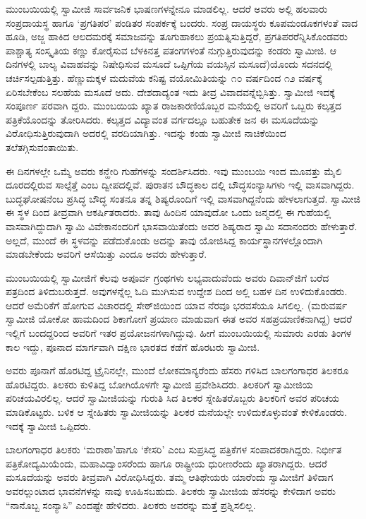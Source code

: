 ಮುಂಬಯಿಯಲ್ಲಿ ಸ್ವಾಮೀಜಿ ಸಾರ್ವಜನಿಕ ಭಾಷಣಗಳನ್ನೇನೂ ಮಾಡಲಿಲ್ಲ. ಆದರೆ ಅವರು ಅಲ್ಲಿ ಹಲವಾರು ಸಂಪ್ರದಾಯಸ್ಥ ಹಾಗೂ ‘ಪ್ರಗತಿಪರ’ ಪಂಡಿತರ ಸಂಪರ್ಕಕ್ಕೆ ಬಂದರು. ಸಂಪ್ರ ದಾಯಸ್ಥರು ಕೂಪಮಂಡೂಕಗಳಂತೆ ವಾದ ಹೂಡಿ, ಅಜ್ಜ ಹಾಕಿದ ಆಲದಮರಕ್ಕೆ ಸಮಾಜವನ್ನು ತೂಗುಹಾಕಲು ಪ್ರಯತ್ನಿಸುತ್ತಿದ್ದರೆ, ಪ್ರಗತಿಪರರೆನ್ನಿಸಿಕೊಂಡವರು ಪಾಶ್ಚಾತ್ಯ ಸಂಸ್ಕೃತಿಯ ಕಣ್ಣು ಕೋರೈಸುವ ಬೆಳಕಿನತ್ತ ಪತಂಗಗಳಂತೆ ನುಗ್ಗುತ್ತಿರುವುದನ್ನು ಕಂಡರು ಸ್ವಾಮೀಜಿ. ಆ ದಿನಗಳಲ್ಲಿ ಬಾಲ್ಯ ವಿವಾಹವನ್ನು ನಿಷೇಧಿಸುವ ಮಸೂದೆ ಒಪ್ಪಿಗೆಯ ವಯಸ್ಸಿನ ಮಸೂದೆ)ಯೊಂದು ಸದನದಲ್ಲಿ ಚರ್ಚಿಸಲ್ಪಡುತ್ತಿತ್ತು. ಹೆಣ್ಣುಮಕ್ಕಳ ಮದುವೆಯ ಕನಿಷ್ಟ ವಯೋಮಿತಿಯನ್ನು ೧೦ ವರ್ಷದಿಂದ ೧೨ ವರ್ಷಕ್ಕೆ ಏರಿಸಬೇಕೆಂಬ ಸಲಹೆಯ ಮಸೂದೆ ಅದು. ದೇಶದಾದ್ಯಂತ ಇದು ತೀವ್ರ ವಿವಾದವನ್ನೆಬ್ಬಿಸಿತ್ತು. ಸ್ವಾಮೀಜಿ ಇದಕ್ಕೆ ಸಂಪೂರ್ಣ ಪರವಾಗಿ ದ್ದರು. ಮುಂಬಯಿಯ ಖ್ಯಾತ ರಾಜಕಾರಣಿಯೊಬ್ಬರ ಮನೆಯಲ್ಲಿ ಅವರಿಗೆ ಒಬ್ಬರು ಕಲ್ಕತ್ತದ ಪತ್ರಿಕೆಯೊಂದನ್ನು ತೋರಿಸಿದರು. ಕಲ್ಕತ್ತದ ವಿದ್ಯಾವಂತ ವರ್ಗದಲ್ಲೂ ಬಹುತೇಕ ಜನ ಈ ಮಸೂದೆಯನ್ನು ವಿರೋಧಿಸುತ್ತಿರುವುದಾಗಿ ಅದರಲ್ಲಿ ವರದಿಯಾಗಿತ್ತು. ಇದನ್ನು ಕಂಡು ಸ್ವಾಮೀಜಿ ನಾಚಿಕೆಯಿಂದ ತಲೆತಗ್ಗಿಸುವಂತಾಯಿತು.

ಈ ದಿನಗಳಲ್ಲೇ ಒಮ್ಮೆ ಅವರು ಕನ್ಹೇರಿ ಗುಹೆಗಳನ್ನು ಸಂದರ್ಶಿಸಿದರು. ಇವು ಮುಂಬಯಿ ಇಂದ ಮೂವತ್ತು ಮೈಲಿ ದೂರದಲ್ಲಿರುವ ಸಾಲ್ಸೆತ್ತೆ ಎಂಬ ದ್ವೀಪದಲ್ಲಿವೆ. ಪುರಾತನ ಬೌದ್ಧಕಾಲ ದಲ್ಲಿ ಬೌದ್ಧಸಂನ್ಯಾಸಿಗಳು ಇಲ್ಲಿ ವಾಸವಾಗಿದ್ದರು. ಬುದ್ಧಘೋಷನೆಂಬ ಪ್ರಸಿದ್ಧ ಬೌದ್ಧ ಸಂತನೂ ತನ್ನ ಶಿಷ್ಯರೊಂದಿಗೆ ಇಲ್ಲಿ ವಾಸವಾಗಿದ್ದನೆಂದು ಹೇಳಲಾಗುತ್ತದೆ. ಸ್ವಾಮೀಜಿ ಈ ಸ್ಥಳ ದಿಂದ ತೀವ್ರವಾಗಿ ಆಕರ್ಷಿತರಾದರು. ತಾವು ಹಿಂದಿನ ಯಾವುದೋ ಒಂದು ಜನ್ಮದಲ್ಲಿ ಈ ಗುಹೆಯಲ್ಲಿ ವಾಸವಾಗಿದ್ದುದಾಗಿ ಸ್ವಾಮಿ ವಿವೇಕಾನಂದರಿಗೆ ಭಾಸವಾಯಿತೆಂದು ಅವರ ಶಿಷ್ಯರಾದ ಸ್ವಾಮಿ ಸದಾನಂದರು ಹೇಳುತ್ತಾರೆ. ಅಲ್ಲದೆ, ಮುಂದೆ ಈ ಸ್ಥಳವನ್ನು ಪಡೆದುಕೊಂಡು ಅದನ್ನು ತಾವು ಯೋಜಿಸಿದ್ದ ಕಾರ್ಯಸ್ಥಾನಗಳಲ್ಲೊಂದಾಗಿ ಮಾಡಬೇಕೆಂದು ಅವರಿಗೆ ಆಸೆಯಿತ್ತು ಎಂದೂ ಅವರು ಹೇಳುತ್ತಾರೆ.

ಮುಂಬಯಿಯಲ್ಲಿ ಸ್ವಾಮೀಜಿಗೆ ಕೆಲವು ಅಪೂರ್ವ ಗ್ರಂಥಗಳು ಲಭ್ಯವಾದುವೆಂದು ಅವರು ದಿವಾನ್​ಜಿಗೆ ಬರೆದ ಪತ್ರದಿಂದ ತಿಳಿದುಬರುತ್ತದೆ. ಅವುಗಳನ್ನೆಲ್ಲ ಓದಿ ಮುಗಿಸುವ ಉದ್ದೇಶ ದಿಂದ ಅಲ್ಲಿ ಬಹಳ ದಿನ ಉಳಿದುಕೊಂಡರು. ಆದರೆ ಅಮೆರಿಕೆಗೆ ಹೋಗುವ ವಿಚಾರದಲ್ಲಿ ಸೇಠ್​ಜಿಯಿಂದ ಯಾವ ನೆರವೂ ಭರವಸೆಯೂ ಸಿಗಲಿಲ್ಲ. (ಮರುವರ್ಷ ಸ್ವಾಮೀಜಿ ಯೋಕೋ ಹಾಮದಿಂದ ಶಿಕಾಗೋಗೆ ಪ್ರಯಾಣ ಮಾಡುವಾಗ ಈತ ಅವರ ಸಹಪ್ರಯಾಣಿಕನಾಗಿದ್ದ) ಆದರೆ ಇಲ್ಲಿಗೆ ಬಂದದ್ದರಿಂದ ಅವರಿಗೆ ಇತರ ಪ್ರಯೋಜನಗಳಾಗಿದ್ದುವು. ಹೀಗೆ ಮುಂಬಯಿಯಲ್ಲಿ ಸುಮಾರು ಎರಡು ತಿಂಗಳ ಕಾಲ ಇದ್ದು, ಪೂನಾದ ಮಾರ್ಗವಾಗಿ ದಕ್ಷಿಣ ಭಾರತದ ಕಡೆಗೆ ಹೊರಟರು ಸ್ವಾಮೀಜಿ.

ಅವರು ಪೂನಾಗೆ ಹೊರಟಿದ್ದ ಟ್ರೈನಿನಲ್ಲೇ, ಮುಂದೆ ಲೋಕಮಾನ್ಯರೆಂದು ಹೆಸರು ಗಳಿಸಿದ ಬಾಲಗಂಗಾಧರ ತಿಲಕರೂ ಹೊರಟಿದ್ದರು. ತಿಲಕರು ಕುಳಿತಿದ್ದ ಬೋಗಿಯೊಳಗೇ ಸ್ವಾಮೀಜಿ ಪ್ರವೇಶಿಸಿದರು. ತಿಲಕರಿಗೆ ಸ್ವಾಮೀಜಿಯ ಪರಿಚಯವಿರಲಿಲ್ಲ. ಆದರೆ ಸ್ವಾಮೀಜಿಯನ್ನು ಗುರುತಿ ಸಿದ ತಿಲಕರ ಸ್ನೇಹಿತರೊಬ್ಬರು ತಿಲಕರಿಗೆ ಅವರ ಪರಿಚಯ ಮಾಡಿಕೊಟ್ಟರು. ಬಳಿಕ ಆ ಸ್ನೇಹಿತರು ಸ್ವಾಮೀಜಿಯನ್ನು ತಿಲಕರ ಮನೆಯಲ್ಲೇ ಉಳಿದುಕೊಳ್ಳುವಂತೆ ಕೇಳಿಕೊಂಡರು. ಇದಕ್ಕೆ ಸ್ವಾಮೀಜಿ ಒಪ್ಪಿದರು.

ಬಾಲಗಂಗಾಧರ ತಿಲಕರು ‘ಮರಾಠಾ’ಹಾಗೂ ‘ಕೇಸರಿ’ ಎಂಬ ಸುಪ್ರಸಿದ್ಧ ಪತ್ರಿಕೆಗಳ ಸಂಪಾದಕರಾಗಿದ್ದರು. ನಿರ್ಭೀತ ಪತ್ರಿಕೋದ್ಯಮಿಯೆಂದು, ಮಹಾವಿದ್ವಾಂಸರೆಂದು ಹಾಗೂ ರಾಷ್ಟ್ರೀಯ ಧುರೀಣರೆಂದು ಖ್ಯಾತರಾಗಿದ್ದರು. ಆದರೆ  ಮಸೂದೆಯನ್ನು ಅವರು ತೀವ್ರವಾಗಿ ವಿರೋಧಿಸಿದ್ದರು. ತಮ್ಮ ಆತಿಥೇಯರು ಯಾರೆಂದು ಸ್ವಾಮೀಜಿಗೆ ತಿಳಿದಾಗ ಅವರಲ್ಲುಂಟಾದ ಭಾವನೆಗಳನ್ನು ನಾವು ಊಹಿಸಬಹುದು. ತಿಲಕರು ಸ್ವಾಮೀಜಿಯ ಹೆಸರನ್ನು ಕೇಳಿದಾಗ ಅವರು “ನಾನೊಬ್ಬ ಸಂನ್ಯಾಸಿ” ಎಂದಷ್ಟೇ ಹೇಳಿದರು. ತಿಲಕರು ಅವರನ್ನು ಮತ್ತೆ ಪ್ರಶ್ನಿಸಲಿಲ್ಲ.

